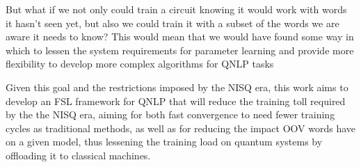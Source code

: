 But what if we not only could train a circuit knowing it would work with words it hasn't seen yet, but also we could train it with a subset of the words we are aware it needs to know? This would mean that we would have found some way in which to lessen the system requirements for parameter learning and provide more flexibility to develop more complex algorithms for QNLP tasks

Given this goal and the restrictions imposed by the NISQ era, this work aims to develop an FSL framework for QNLP that will reduce the training toll required by the the NISQ era, aiming for both fast convergence to need fewer training cycles as traditional methods, as well as for reducing the impact OOV words have on a given model, thus lessening the training load on quantum systems by offloading it to classical machines.